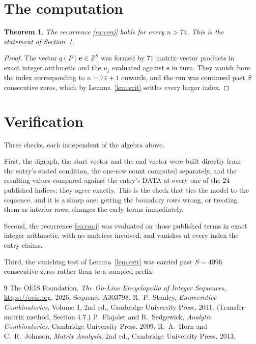 \documentclass[11pt,a4paper]{article}
\theoremstyle{plain}
\newtheorem{theorem}{Theorem}
\theoremstyle{definition}
\begin{document}
\section{The computation}

\begin{theorem}
The recurrence \eqref{eq:conj} holds for every $n>74$. This is the statement of
Section~1.
\end{theorem}

\begin{proof}
The vector $q(P)\mathbf{e}\in\mathbb{Z}^{S}$ was formed by $71$ matrix--vector
products in exact integer arithmetic and the $u_j$ evaluated against $\mathbf{s}$ in turn.
They vanish from the index corresponding to $n=74+1$ onwards, and the run was continued
past $S$ consecutive zeros, which by Lemma~\ref{lem:crit} settles every larger index.
\end{proof}

\section{Verification}

Three checks, each independent of the algebra above.

First, the digraph, the start vector and the end vector were built directly from the
entry's stated condition, the one-row count computed separately, and the resulting values
compared against the entry's DATA at every one of the $24$ published indices; they
agree exactly. This is the check that ties the model to the sequence, and it is a sharp one:
getting the boundary rows wrong, or treating them as interior rows, changes the early terms
immediately.

Second, the recurrence \eqref{eq:conj} was evaluated on those published terms in exact
integer arithmetic, with no matrices involved, and vanishes at every index the entry claims.

Third, the vanishing test of Lemma~\ref{lem:crit} was carried past $S=4096$ consecutive
zeros rather than to a sampled prefix.

\begin{thebibliography}{9}
 The OEIS Foundation, \emph{The On-Line Encyclopedia of Integer
Sequences}, \url{https://oeis.org}, 2026. Sequence A303798.
 R.~P.~Stanley, \emph{Enumerative Combinatorics}, Volume 1, 2nd ed.,
Cambridge University Press, 2011. (Transfer-matrix method, Section 4.7.)
 P.~Flajolet and R.~Sedgewick, \emph{Analytic Combinatorics}, Cambridge
University Press, 2009.
 R.~A.~Horn and C.~R.~Johnson, \emph{Matrix Analysis}, 2nd ed., Cambridge
University Press, 2013.
\end{thebibliography}
\end{document}
